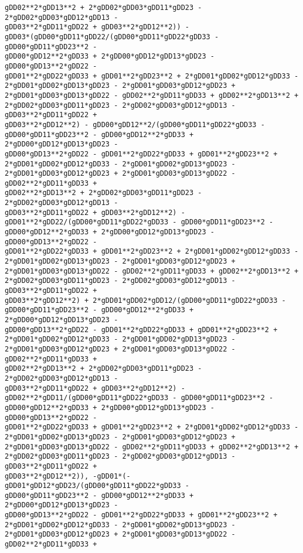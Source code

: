 \documentclass[landscape,letterpaper,10pt,english]{article}
\begin{document}
\begin{Verbatim}[commandchars=\\\{\}]
gDD02**2*gDD13**2 + 2*gDD02*gDD03*gDD11*gDD23 - 2*gDD02*gDD03*gDD12*gDD13 -
gDD03**2*gDD11*gDD22 + gDD03**2*gDD12**2)) -
gDD03*(gDD00*gDD11*gDD22/(gDD00*gDD11*gDD22*gDD33 - gDD00*gDD11*gDD23**2 -
gDD00*gDD12**2*gDD33 + 2*gDD00*gDD12*gDD13*gDD23 - gDD00*gDD13**2*gDD22 -
gDD01**2*gDD22*gDD33 + gDD01**2*gDD23**2 + 2*gDD01*gDD02*gDD12*gDD33 -
2*gDD01*gDD02*gDD13*gDD23 - 2*gDD01*gDD03*gDD12*gDD23 +
2*gDD01*gDD03*gDD13*gDD22 - gDD02**2*gDD11*gDD33 + gDD02**2*gDD13**2 +
2*gDD02*gDD03*gDD11*gDD23 - 2*gDD02*gDD03*gDD12*gDD13 - gDD03**2*gDD11*gDD22 +
gDD03**2*gDD12**2) - gDD00*gDD12**2/(gDD00*gDD11*gDD22*gDD33 -
gDD00*gDD11*gDD23**2 - gDD00*gDD12**2*gDD33 + 2*gDD00*gDD12*gDD13*gDD23 -
gDD00*gDD13**2*gDD22 - gDD01**2*gDD22*gDD33 + gDD01**2*gDD23**2 +
2*gDD01*gDD02*gDD12*gDD33 - 2*gDD01*gDD02*gDD13*gDD23 -
2*gDD01*gDD03*gDD12*gDD23 + 2*gDD01*gDD03*gDD13*gDD22 - gDD02**2*gDD11*gDD33 +
gDD02**2*gDD13**2 + 2*gDD02*gDD03*gDD11*gDD23 - 2*gDD02*gDD03*gDD12*gDD13 -
gDD03**2*gDD11*gDD22 + gDD03**2*gDD12**2) -
gDD01**2*gDD22/(gDD00*gDD11*gDD22*gDD33 - gDD00*gDD11*gDD23**2 -
gDD00*gDD12**2*gDD33 + 2*gDD00*gDD12*gDD13*gDD23 - gDD00*gDD13**2*gDD22 -
gDD01**2*gDD22*gDD33 + gDD01**2*gDD23**2 + 2*gDD01*gDD02*gDD12*gDD33 -
2*gDD01*gDD02*gDD13*gDD23 - 2*gDD01*gDD03*gDD12*gDD23 +
2*gDD01*gDD03*gDD13*gDD22 - gDD02**2*gDD11*gDD33 + gDD02**2*gDD13**2 +
2*gDD02*gDD03*gDD11*gDD23 - 2*gDD02*gDD03*gDD12*gDD13 - gDD03**2*gDD11*gDD22 +
gDD03**2*gDD12**2) + 2*gDD01*gDD02*gDD12/(gDD00*gDD11*gDD22*gDD33 -
gDD00*gDD11*gDD23**2 - gDD00*gDD12**2*gDD33 + 2*gDD00*gDD12*gDD13*gDD23 -
gDD00*gDD13**2*gDD22 - gDD01**2*gDD22*gDD33 + gDD01**2*gDD23**2 +
2*gDD01*gDD02*gDD12*gDD33 - 2*gDD01*gDD02*gDD13*gDD23 -
2*gDD01*gDD03*gDD12*gDD23 + 2*gDD01*gDD03*gDD13*gDD22 - gDD02**2*gDD11*gDD33 +
gDD02**2*gDD13**2 + 2*gDD02*gDD03*gDD11*gDD23 - 2*gDD02*gDD03*gDD12*gDD13 -
gDD03**2*gDD11*gDD22 + gDD03**2*gDD12**2) -
gDD02**2*gDD11/(gDD00*gDD11*gDD22*gDD33 - gDD00*gDD11*gDD23**2 -
gDD00*gDD12**2*gDD33 + 2*gDD00*gDD12*gDD13*gDD23 - gDD00*gDD13**2*gDD22 -
gDD01**2*gDD22*gDD33 + gDD01**2*gDD23**2 + 2*gDD01*gDD02*gDD12*gDD33 -
2*gDD01*gDD02*gDD13*gDD23 - 2*gDD01*gDD03*gDD12*gDD23 +
2*gDD01*gDD03*gDD13*gDD22 - gDD02**2*gDD11*gDD33 + gDD02**2*gDD13**2 +
2*gDD02*gDD03*gDD11*gDD23 - 2*gDD02*gDD03*gDD12*gDD13 - gDD03**2*gDD11*gDD22 +
gDD03**2*gDD12**2)), -gDD01*(-gDD01*gDD12*gDD23/(gDD00*gDD11*gDD22*gDD33 -
gDD00*gDD11*gDD23**2 - gDD00*gDD12**2*gDD33 + 2*gDD00*gDD12*gDD13*gDD23 -
gDD00*gDD13**2*gDD22 - gDD01**2*gDD22*gDD33 + gDD01**2*gDD23**2 +
2*gDD01*gDD02*gDD12*gDD33 - 2*gDD01*gDD02*gDD13*gDD23 -
2*gDD01*gDD03*gDD12*gDD23 + 2*gDD01*gDD03*gDD13*gDD22 - gDD02**2*gDD11*gDD33 +

\end{Verbatim}
\end{document}
